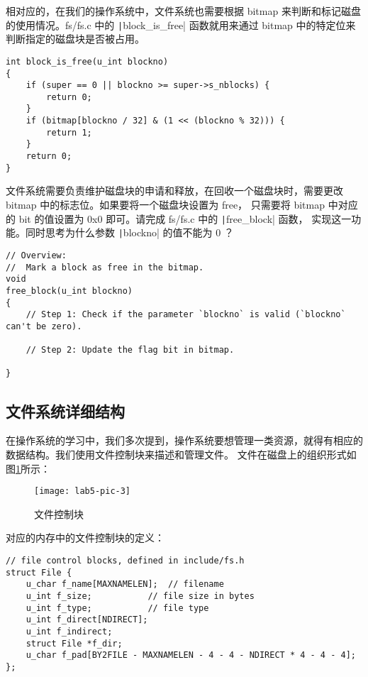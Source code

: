 相对应的，在我们的操作系统中，文件系统也需要根据 bitmap 来判断和标记磁盘的使用情况。fs/fs.c 中的 \texttt|block_is_free|
函数就用来通过 bitmap 中的特定位来判断指定的磁盘块是否被占用。

\begin{verbatim}
int block_is_free(u_int blockno)
{
    if (super == 0 || blockno >= super->s_nblocks) {
        return 0;
    }
    if (bitmap[blockno / 32] & (1 << (blockno % 32))) {
        return 1;
    }
    return 0;
}
\end{verbatim}

\begin{exercise}
文件系统需要负责维护磁盘块的申请和释放，在回收一个磁盘块时，需要更改 bitmap 中的标志位。如果要将一个磁盘块设置为 free，
只需要将 bitmap 中对应的 bit 的值设置为 0x0 即可。请完成 fs/fs.c 中的 \texttt|free_block| 函数，
实现这一功能。同时思考为什么参数 \texttt|blockno| 的值不能为 0 ？

\begin{verbatim}
// Overview:
//  Mark a block as free in the bitmap.
void
free_block(u_int blockno)
{
    // Step 1: Check if the parameter `blockno` is valid (`blockno` can't be zero). 

    // Step 2: Update the flag bit in bitmap.

}
\end{verbatim}

\end{exercise}

\subsection{文件系统详细结构}

在操作系统的学习中，我们多次提到，操作系统要想管理一类资源，就得有相应的数据结构。我们使用文件控制块来描述和管理文件。
文件在磁盘上的组织形式如图\ref{lab5-pic-3}所示：

\begin{figure}[htbp]
  \centering
  \texttt{[image: lab5-pic-3]}
  \caption{文件控制块}\label{lab5-pic-3}
\end{figure}

对应的内存中的文件控制块的定义：

\begin{verbatim}
// file control blocks, defined in include/fs.h
struct File {
    u_char f_name[MAXNAMELEN];  // filename
    u_int f_size;           // file size in bytes
    u_int f_type;           // file type
    u_int f_direct[NDIRECT];
    u_int f_indirect;
    struct File *f_dir;
    u_char f_pad[BY2FILE - MAXNAMELEN - 4 - 4 - NDIRECT * 4 - 4 - 4];
};
\end{verbatim}

